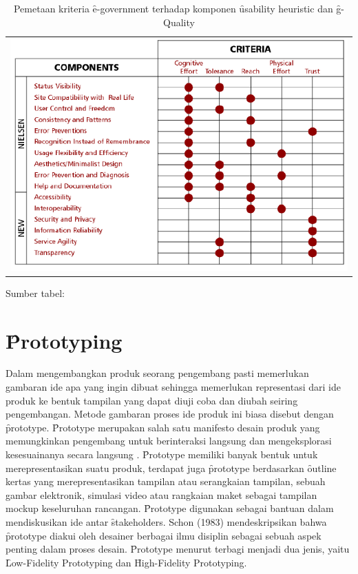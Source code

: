\begin{table}
	\centering
	\caption{Pemetaan kriteria \f{e-government} terhadap komponen \f{usability heuristic} dan \f{g-Quality}}
	\label{tab:mappingegov}
	\begin{tabular}{c}
		\includegraphics[width=\textwidth]
		{pics/mappinggq.PNG}
	\end{tabular}
	\begin{center}
		{\small Sumber tabel: \citep{paper.garcia}}
	\end{center}
\end{table}
\section{\f{Prototyping}}
Dalam mengembangkan produk seorang pengembang pasti memerlukan gambaran ide apa yang ingin dibuat sehingga memerlukan representasi dari ide produk ke bentuk tampilan yang dapat diuji coba dan diubah seiring pengembangan. Metode gambaran proses ide produk ini biasa disebut dengan \f{prototype}. \f{Prototype} merupakan salah satu manifesto desain produk yang memungkinkan pengembang untuk berinteraksi langsung dan mengeksplorasi kesesuainanya secara langsung \citep{buku.preece}. \f{Prototype} memiliki banyak bentuk untuk merepresentasikan suatu produk, terdapat juga \f{prototype} berdasarkan \f{outline} kertas yang merepresentasikan tampilan atau serangkaian tampilan, sebuah gambar elektronik, simulasi video atau rangkaian maket sebagai tampilan mockup keseluruhan rancangan. \f{Prototype} digunakan sebagai bantuan dalam mendiskusikan ide antar \f{stakeholders}. Schon (1983) mendeskripsikan bahwa \f{prototype} diakui oleh desainer berbagai ilmu disiplin sebagai sebuah aspek penting dalam proses desain. \f{Prototype} menurut \citet{buku.preece} terbagi menjadi dua jenis, yaitu \f{Low-Fidelity Prototyping} dan \f{High-Fidelity Prototyping}.

